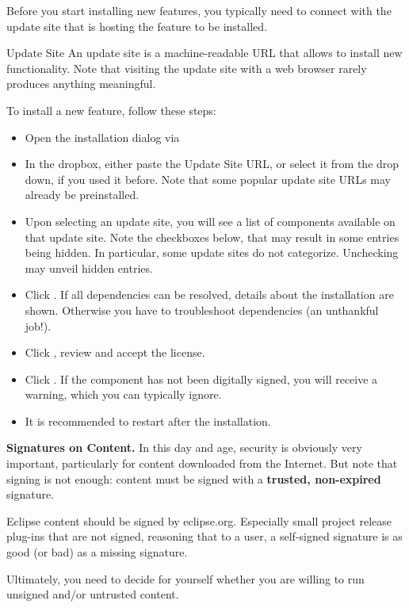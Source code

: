 Before you start installing new features, you typically need to connect with the update site that is hosting the feature to be installed.

\begin{definition}{Update Site}
An update site is a machine-readable URL that allows \pror{} to install new functionality.  Note that visiting the update site with a web browser rarely produces anything meaningful.
\end{definition}

To install a new feature, follow these steps:

\begin{itemize}
\item Open the installation dialog via 
\item In the  dropbox, either paste the Update Site URL, or select it from the drop down, if you used it before.  Note that some popular update site URLs may already be preinstalled.
\item Upon selecting an update site, you will see a list of components available on that update site.  Note the checkboxes below, that may result in some entries being hidden.  In particular, some update sites do not categorize.  Unchecking  may unveil hidden entries.
\item Click .  If all dependencies can be resolved, details about the installation are shown.  Otherwise you have to troubleshoot dependencies (an unthankful job!).
\item Click , review and accept the license.
\item Click .  If the component has not been digitally signed, you will receive a warning, which you can typically ignore.
\item It is recommended to restart after the installation.
\end{itemize}

\begin{info}
\textbf{Signatures on Content.}  In this day and age, security is obviously very important, particularly for content downloaded from the Internet.  But note that signing is not enough: content must be signed with a \textbf{trusted, non-expired} signature.

Eclipse content should be signed by eclipse.org.  Especially small project release plug-ins that are not signed, reasoning that to a user, a self-signed signature is as good (or bad) as a missing signature.

Ultimately, you need to decide for yourself whether you are willing to run unsigned and/or untrusted content.
\end{info}

